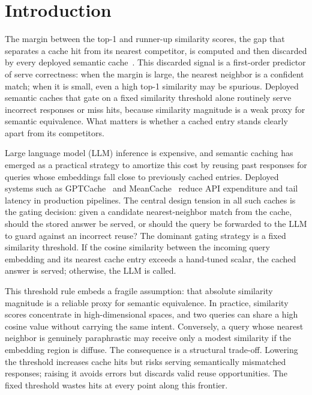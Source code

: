 \section{Introduction}

The margin between the top-1 and runner-up similarity scores, the gap that separates a cache hit from its nearest competitor, is computed and then discarded by every deployed semantic cache~\cite{bang2023gptcache,gill2025meancache,schroeder2026vcache}. This discarded signal is a first-order predictor of serve correctness: when the margin is large, the nearest neighbor is a confident match; when it is small, even a high top-1 similarity may be spurious.
Deployed semantic caches that gate on a fixed similarity threshold alone routinely serve incorrect responses or miss hits, because similarity magnitude is a weak proxy for semantic equivalence. What matters is whether a cached entry stands clearly apart from its competitors.

Large language model (LLM) inference is expensive, and semantic caching has emerged as a practical strategy to amortize this cost by reusing past responses for queries whose embeddings fall close to previously cached entries. Deployed systems such as GPTCache~\cite{bang2023gptcache} and MeanCache~\cite{gill2025meancache} reduce API expenditure and tail latency in production pipelines. The central design tension in all such caches is the gating decision: given a candidate nearest-neighbor match from the cache, should the stored answer be served, or should the query be forwarded to the LLM to guard against an incorrect reuse? The dominant gating strategy is a fixed similarity threshold. If the cosine similarity between the incoming query embedding and its nearest cache entry exceeds a hand-tuned scalar, the cached answer is served; otherwise, the LLM is called.

This threshold rule embeds a fragile assumption: that absolute similarity magnitude is a reliable proxy for semantic equivalence. In practice, similarity scores concentrate in high-dimensional spaces, and two queries can share a high cosine value without carrying the same intent. Conversely, a query whose nearest neighbor is genuinely paraphrastic may receive only a modest similarity if the embedding region is diffuse. The consequence is a structural trade-off. Lowering the threshold increases cache hits but risks serving semantically mismatched responses; raising it avoids errors but discards valid reuse opportunities. The fixed threshold wastes hits at every point along this frontier.

